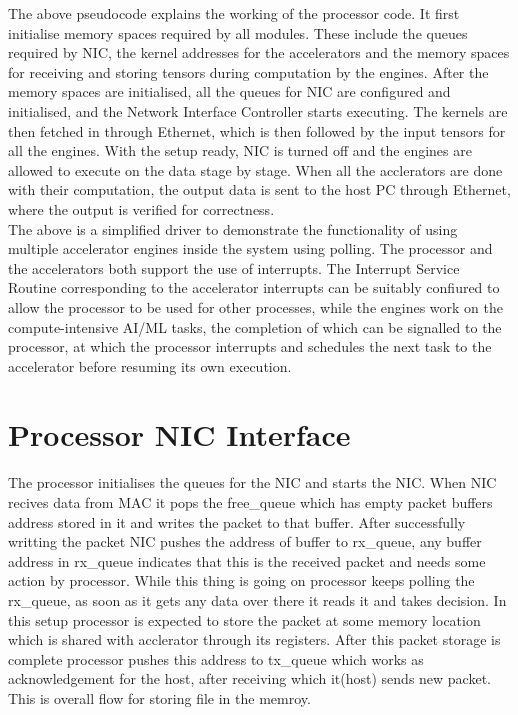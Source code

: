 \documentclass[12pt]{report}
\begin{document}
The above pseudocode explains the working of the processor code. It first initialise memory spaces required by all modules. These include the queues required by NIC, the kernel addresses for the accelerators and the memory spaces for receiving and storing tensors during computation by the engines. After the memory spaces are initialised, all the queues for NIC are configured and initialised, and the Network Interface Controller starts executing. The kernels are then fetched in through Ethernet, which is then followed by the input tensors for all the engines. With the setup ready, NIC is turned off and the engines are allowed to execute on the data stage by stage. When all the acclerators are done with their computation, the output data is sent to the host PC through Ethernet, where the output is verified for correctness.
\\

The above is a simplified driver to demonstrate the functionality of using multiple accelerator engines inside the system using polling. The processor and the  accelerators both support the use of interrupts. The Interrupt Service Routine corresponding to the accelerator interrupts can be suitably confiured to allow the processor to be used for other processes, while the engines work on the compute-intensive AI/ML tasks, the completion of which can be signalled to the processor, at which the processor interrupts and schedules the next task to the accelerator before resuming its own execution.
\\


\section{Processor NIC Interface}

The processor initialises the queues for the NIC and starts the NIC. When NIC recives data from MAC it pops the free\_queue which has empty packet buffers address stored in it and writes the packet to that buffer. After successfully writting the packet NIC pushes the address of buffer to rx\_queue, any buffer address in rx\_queue indicates that this is the received packet and needs some action by processor. While this thing is going on processor keeps polling the rx\_queue, as soon as it gets any data over there it reads it and takes decision. In this setup processor is expected to store the packet at some memory location which is shared with acclerator through its registers. After this packet storage is complete processor pushes this address to tx\_queue which works as acknowledgement for the host, after receiving which it(host) sends new packet. This is overall flow for storing file in the memroy.
\\
\end{document}
